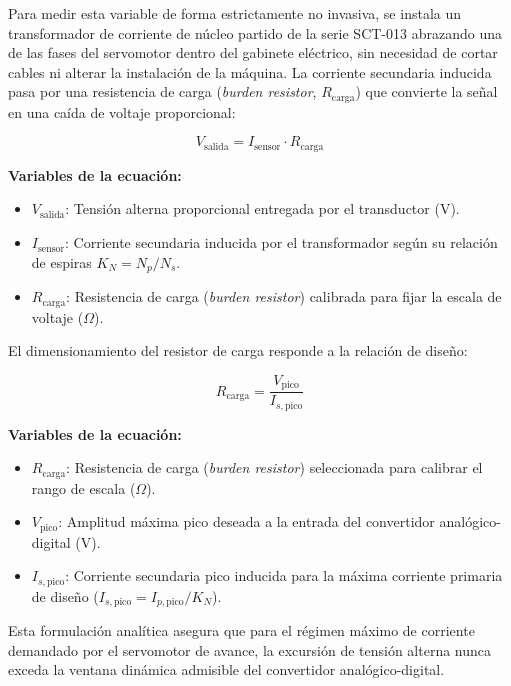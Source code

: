 Para medir esta variable de forma estrictamente no invasiva, se instala un transformador de corriente de núcleo partido de la serie SCT-013 abrazando una de las fases del servomotor dentro del gabinete eléctrico, sin necesidad de cortar cables ni alterar la instalación de la máquina. La corriente secundaria inducida pasa por una resistencia de carga (\textit{burden resistor}, $R_{\text{carga}}$) que convierte la señal en una caída de voltaje proporcional:

\begin{equation}
V_{\text{salida}} = I_{\text{sensor}} \cdot R_{\text{carga}}
\label{eq:sensor_corriente}
\end{equation}

\noindent\textbf{Variables de la ecuación:}
\begin{itemize}
    \item $V_{\text{salida}}$: Tensión alterna proporcional entregada por el transductor ($\text{V}$).
    \item $I_{\text{sensor}}$: Corriente secundaria inducida por el transformador según su relación de espiras $K_N = N_p / N_s$.
    \item $R_{\text{carga}}$: Resistencia de carga (\textit{burden resistor}) calibrada para fijar la escala de voltaje ($\Omega$).
\end{itemize}

El dimensionamiento del resistor de carga responde a la relación de diseño:

\begin{equation}
R_{\text{carga}} = \frac{V_{\text{pico}}}{I_{s,\text{pico}}}
\label{eq:resistor_burden}
\end{equation}

\noindent\textbf{Variables de la ecuación:}
\begin{itemize}
    \item $R_{\text{carga}}$: Resistencia de carga (\textit{burden resistor}) seleccionada para calibrar el rango de escala ($\Omega$).
    \item $V_{\text{pico}}$: Amplitud máxima pico deseada a la entrada del convertidor analógico-digital ($\text{V}$).
    \item $I_{s,\text{pico}}$: Corriente secundaria pico inducida para la máxima corriente primaria de diseño ($I_{s,\text{pico}} = I_{p,\text{pico}} / K_N$).
\end{itemize}

Esta formulación analítica asegura que para el régimen máximo de corriente demandado por el servomotor de avance, la excursión de tensión alterna nunca exceda la ventana dinámica admisible del convertidor analógico-digital.

